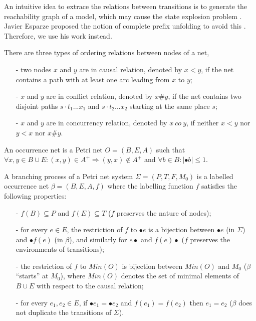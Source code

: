 \documentclass[dvips,...]{llncs}
\begin{document}
An intuitive idea to extrace the relations between transitions is to generate the reachability graph of a model, which may cause the state explosion problem \cite{mcmillan1995technique}. Javier Esparze proposed the notion of complete prefix unfolding to avoid this \cite{esparza1996improvement}. Therefore, we use his work instead.

\begin{definition}\label{def:orderingRelations}
There are three types of ordering relations between nodes of a net,
	\begin{itemize}
		\item[-] two nodes $x$ and $y$ are in causal relation, denoted by $x<y$, if the net contains a path with at least one arc leading from $x$ to $y$;
		\item[-] $x$ and $y$ are in conflict relation, denoted by $x\#y$, if the net contains two disjoint paths $s\cdot t_{1}...x_{1}$ and $s\cdot t_{2}...x_{2}$ starting at the same place $s$;
		\item[-] $x$ and $y$ are in concurrency relation, denoted by $x~co~y$, if neither $x<y$ nor $y<x$ nor $x\#y$.
	\end{itemize}
\end{definition}

\begin{definition}\label{def:occurrenceNet}
An occurrence net is a Petri net $O=(B,E,A)$ such that $\forall x,y\in B\cup E:(x,y)
\in A^{+}\Rightarrow(y,x)\notin A^{+}$ and $\forall b\in B:|\bullet b|\leq 1$.
\end{definition}

\begin{definition}\label{def:branchingProcess}
A branching process of a Petri net system $\Sigma=(P,T,F,M_{0})$ is a labelled occurrence net $\beta=(B,E,A,f)$ where the labelling function $f$ satisfies the following properties:
	\begin{itemize}
		\item[-] $f(B)\subseteq P$ and $f(E)\subseteq T$ ($f$ preserves the nature of nodes);
		\item[-] for every $e\in E$, the restriction of $f$ to $\bullet e$ is a bijection between $\bullet e$ (in $\Sigma$) and $\bullet f(e)$ (in $\beta$), and similarly for $e\bullet$ and $f(e)\bullet$ ($f$ preserves the environments of transitions);
		\item[-] the restriction of $f$ to $Min(O)$ is bijection between $Min(O)$ and $M_{0}$ ($\beta$ ``starts'' at $M_{0}$), where $Min(O)$ denotes the set of minimal elements of $B\cup E$ with respect to the causal relation;
		\item[-] for every $e_{1},e_{2}\in E$, if $\bullet e_{1}=\bullet e_{2}$ and $f(e_{1})=f(e_{2})$ then $e_{1}=e_{2}$ ($\beta$ does not duplicate the transitions of $\Sigma$).
	\end{itemize}
\end{definition}
\end{document}
